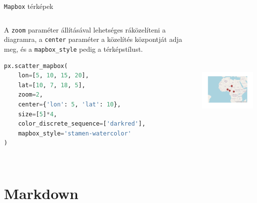 \documentclass[english, aspectratio=169]{beamer}
\makeatletter
\let\origtableofcontents=\tableofcontents
\def\tableofcontents{\@ifnextchar[{\origtableofcontents}{\gobbletableofcontents}}
\def\gobbletableofcontents#1{\origtableofcontents}
\makeatother
\begin{document}
\begin{frame}[fragile]{\texttt{Mapbox} térképek}
	\begin{columns}
		\begin{column}{.5\textwidth}
			A \texttt{zoom} paraméter állításával lehetséges ráközelíteni a diagramra, a \texttt{center} paraméter a közelítés központját adja meg, és a \texttt{mapbox\_style} pedig a térképstílust.\par\medskip
			\begin{lstlisting}[language=python]
px.scatter_mapbox(
	lon=[5, 10, 15, 20],
	lat=[10, 7, 18, 5],
	zoom=2,
	center={'lon': 5, 'lat': 10},
	size=[5]*4,
	color_discrete_sequence=['darkred'],
	mapbox_style='stamen-watercolor'
)				
			\end{lstlisting}
		\end{column}
		\begin{column}{.5\textwidth}
			\begin{center}
				\includegraphics[width=7cm, height=7cm, keepaspectratio]{images/scatter_30.png}
			\end{center}
		\end{column}
	\end{columns}
\end{frame}

\section{Markdown}

\begin{frame}{}
	\tableofcontents[currentsection]
\end{frame}

\end{document}

